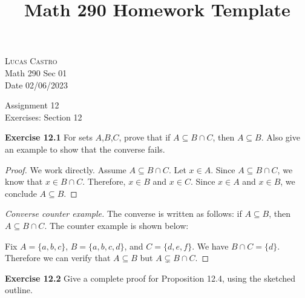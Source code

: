 \documentclass[12pt,oneside]{article}
\newenvironment{exercise}[1]{\vspace{.1in}\noindent\textbf{Exercise #1 \hspace{.05em}}}{}
\begin{document}
\title{Math 290 Homework Template}

\begin{flushright}
\textsc{Lucas Castro}  \\
Math 290 Sec 01\\
Date 02/06/2023
\end{flushright}

\begin{center}
\textsf{Assignment 12} \\
\textsf{Exercises: Section 12}
\end{center}


\begin{exercise}{12.1}
For sets $A$,$B$,$C$, prove that if $A \subseteq B \cap C$, then $A \subseteq B$. Also give an example to show that the converse fails.
\end{exercise}

\begin{proof}
We work directly. Assume $A \subseteq B \cap C$. Let $x \in A$. Since $A \subseteq B \cap C$, we know that $x \in B \cap C$. Therefore, $x \in B$ and $x \in C$. Since $x \in A$ and $x \in B$, we conclude $A \subseteq B$.
\end{proof}

\begin{proof}[Converse counter example]
The converse is written as follows: if $A \subseteq B$, then $A \subseteq B \cap C$. The counter example is shown below:

Fix $A = \{a,b,c\}$, $B = \{a,b,c,d\}$, and $C = \{d,e,f\}$. We have $B \cap C = \{d\}$. Therefore we can verify that $A \subseteq B$ but $A \subsetneq B \cap C$.
\end{proof}



\begin{exercise}{12.2}
Give a complete proof for Proposition 12.4, using the sketched outline.
\end{exercise}
\end{document}
